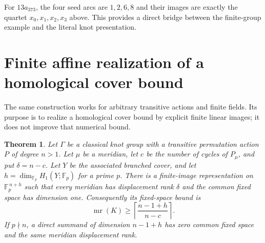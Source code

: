 \documentclass[11pt]{article}
\newtheorem{theorem}{Theorem}
\newcommand{\F}{\mathbb F}
\newcommand{\mr}{\operatorname{mr}}
\begin{document}
For $13a_{373}$, the four seed arcs are $1,2,6,8$ and their images
are exactly the quartet $x_0,x_1,x_2,x_3$ above.
This provides a direct bridge between the finite-group example and
the literal knot presentation.

\section{Finite affine realization of a homological cover bound}

The same construction works for arbitrary transitive actions and finite
fields. Its purpose is to realize a homological cover bound by explicit
finite linear images; it does not improve that numerical bound.

\begin{theorem}\label{thm:realization}
Let $\Gamma$ be a classical knot group with a transitive permutation
action $P$ of degree $n>1$. Let $\mu$ be a meridian, let $c$ be the
number of cycles of $P_\mu$, and put $\delta=n-c$.
Let $Y$ be the associated branched cover, and let
$h=\dim_{\F_p}H_1(Y;\F_p)$ for a prime $p$.
There is a finite-image representation on $\F_p^{\,n+h}$ such that
every meridian has displacement rank $\delta$ and the common fixed
space has dimension one. Consequently its fixed-space bound is
\[
                \mr(K)\ge\left\lceil\frac{n-1+h}{n-c}\right\rceil.
\]
If $p\nmid n$, a direct summand of dimension $n-1+h$ has zero common
fixed space and the same meridian displacement rank.
\end{theorem}
\end{document}

